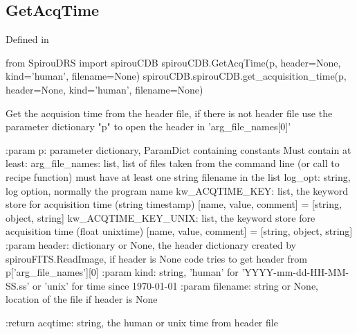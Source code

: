 \noindent\begin{minipage}{\textwidth}
\subsection{GetAcqTime}

Defined in \spirouCDB{}

\begin{pythonbox}
from SpirouDRS import spirouCDB
spirouCDB.GetAcqTime(p, header=None, kind='human', filename=None)
spirouCDB.spirouCDB.get_acquisition_time(p, header=None, kind='human', filename=None)
\end{pythonbox}

\begin{pythondocstring}
Get the acquision time from the header file, if there is not header file
use the parameter dictionary "p" to open the header in 'arg_file_names[0]'

:param p: parameter dictionary, ParamDict containing constants
    Must contain at least:
            arg_file_names: list, list of files taken from the command line
                            (or call to recipe function) must have at least
                            one string filename in the list
            log_opt: string, log option, normally the program name
            kw_ACQTIME_KEY: list, the keyword store for acquisition time
                            (string timestamp)
                        [name, value, comment] = [string, object, string]
            kw_ACQTIME_KEY_UNIX: list, the keyword store fore acquisition
                                 time (float unixtime)
                        [name, value, comment] = [string, object, string]
:param header: dictionary or None, the header dictionary created by
               spirouFITS.ReadImage, if header is None code tries to get
               header from p['arg_file_names'][0]
:param kind: string, 'human' for 'YYYY-mm-dd-HH-MM-SS.ss' or 'unix'
             for time since 1970-01-01
:param filename: string or None, location of the file if header is None

:return acqtime: string, the human or unix time from header file
\end{pythondocstring}
\end{minipage}

